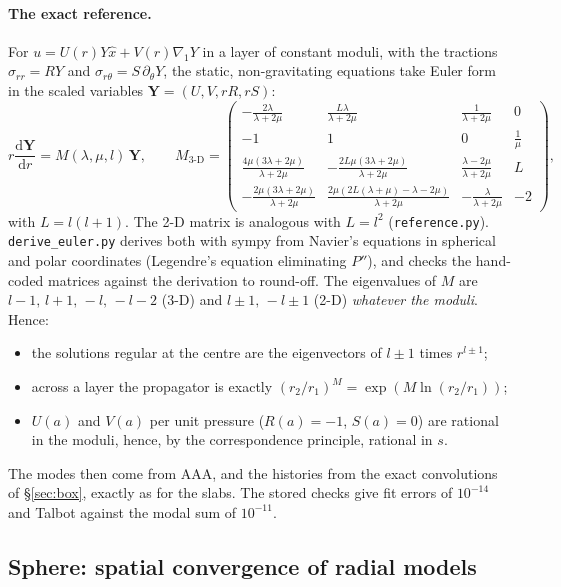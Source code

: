 \documentclass[11pt]{article}
\numberwithin{equation}{section}
\newcommand{\code}[1]{\texttt{#1}}
\begin{document}
\paragraph{The exact reference.}
For $u=U(r)Y\hat x+V(r)\nabla_1Y$ in a layer of constant moduli, with
the tractions $\sigma_{rr}=RY$ and $\sigma_{r\theta}=S\,\partial_\theta Y$,
the static, non-gravitating equations take Euler form in the scaled
variables $\mathbf Y=(U,V,rR,rS)$:
\begin{equation}
  r\frac{\mathrm d\mathbf Y}{\mathrm dr}=M(\lambda,\mu,l)\,\mathbf Y,
  \qquad
  M_{3\text{-D}}=\begin{pmatrix}
  -\frac{2\lambda}{\lambda+2\mu} & \frac{L\lambda}{\lambda+2\mu} & \frac1{\lambda+2\mu} & 0\\
  -1 & 1 & 0 & \frac1\mu\\
  \frac{4\mu(3\lambda+2\mu)}{\lambda+2\mu} & -\frac{2L\mu(3\lambda+2\mu)}{\lambda+2\mu} & \frac{\lambda-2\mu}{\lambda+2\mu} & L\\
  -\frac{2\mu(3\lambda+2\mu)}{\lambda+2\mu} & \frac{2\mu(2L(\lambda+\mu)-\lambda-2\mu)}{\lambda+2\mu} & -\frac{\lambda}{\lambda+2\mu} & -2
  \end{pmatrix},
\end{equation}
with $L=l(l+1)$. The 2-D matrix is analogous with $L=l^2$
(\code{reference.py}). \code{derive\_euler.py} derives both with sympy
from Navier's equations in spherical and polar coordinates (Legendre's
equation eliminating $P''$), and checks the hand-coded matrices against
the derivation to round-off. The eigenvalues of $M$ are
$l-1,\,l+1,\,-l,\,-l-2$ (3-D) and $l\pm1,\,-l\pm1$ (2-D) \emph{whatever
the moduli}. Hence:
\begin{itemize}[leftmargin=*]
\item the solutions regular at the centre are the eigenvectors of
  $l\pm1$ times $r^{l\pm1}$;
\item across a layer the propagator is exactly
  $(r_2/r_1)^M=\exp(M\ln(r_2/r_1))$;
\item $U(a)$ and $V(a)$ per unit pressure ($R(a)=-1$, $S(a)=0$) are
  rational in the moduli, hence, by the correspondence principle,
  rational in $s$.
\end{itemize}
The modes then come from AAA, and the histories from the exact
convolutions of \S\ref{sec:box}, exactly as for the slabs. The stored
checks give fit errors of $10^{-14}$ and Talbot against the modal sum
of $10^{-11}$.

\subsection{Sphere: spatial convergence of radial models}
\label{sec:sphere-radial}
\end{document}
